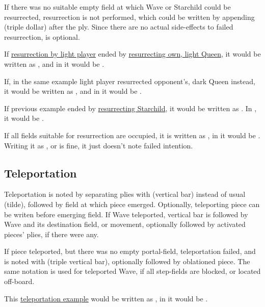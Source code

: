 If there was no suitable empty field at which Wave or Starchild could be resurrected,
resurrection is not performed, which could be written by appending \alg{\$\$\$} (triple
dollar) after the ply. Since there are no actual side-effects to failed resurrection,
\alg{\$\$\$} is optional.

If \hyperref[fig:scn_o_51_syzygy_starchild_init]{resurrection by light player} ended by
\hyperref[fig:scn_o_52_syzygy_starchild_end]{resurrecting own, light Queen}, it would be
written as , and in  it would be .

If, in the same example light player resurrected opponent's, dark Queen instead, it would
be written as , and in  it would be .

If previous example ended by
\hyperref[fig:scn_o_53_syzygy_starchild_resurrection]{resurrecting Starchild}, it would
be written as . In , it would be .

If all fields suitable for resurrection are occupied, it is written as ,
in  it would be . Writing it as , or 
is fine, it just doesn't note failed intention.


\subsection*{Teleportation}
\label{sec:Appendix/Notation/Teleportation}

Teleportation is noted by separating plies with \alg{|} (vertical bar) instead of
usual \alg{\~{}} (tilde), followed by field at which piece emerged. Optionally,
teleporting piece can be writen before emerging field. If Wave teleported, vertical
bar is followed by Wave and its destination field, or movement, optionally followed
by activated pieces' plies, if there were any.

If piece teleported, but there was no empty portal-field, teleportation failed,
and is noted with \alg{|||} (triple vertical bar), optionally followed by oblationed
piece. The same notation is used for teleported Wave, if all step-fields are blocked,
or located off-board.

This \hyperref[fig:scn_n_02_teleport_init]{teleportation example} would be written as
, in  it would be .

